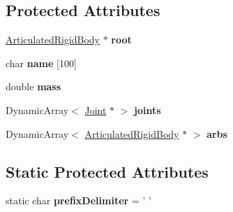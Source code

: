 \subsection*{Protected Attributes}
\begin{DoxyCompactItemize}
\item 
\hypertarget{classCartWheel_1_1Physics_1_1ArticulatedFigure_a728539753c6df22d8ba39049281540c1}{
\hyperlink{classCartWheel_1_1Physics_1_1ArticulatedRigidBody}{ArticulatedRigidBody} $\ast$ {\bfseries root}}
\label{classCartWheel_1_1Physics_1_1ArticulatedFigure_a728539753c6df22d8ba39049281540c1}

\item 
\hypertarget{classCartWheel_1_1Physics_1_1ArticulatedFigure_a7d160508fc74478814fa20c673e52e52}{
char {\bfseries name} \mbox{[}100\mbox{]}}
\label{classCartWheel_1_1Physics_1_1ArticulatedFigure_a7d160508fc74478814fa20c673e52e52}

\item 
\hypertarget{classCartWheel_1_1Physics_1_1ArticulatedFigure_a54a8c1542a1754aa72910b43f8f86f3b}{
double {\bfseries mass}}
\label{classCartWheel_1_1Physics_1_1ArticulatedFigure_a54a8c1542a1754aa72910b43f8f86f3b}

\item 
\hypertarget{classCartWheel_1_1Physics_1_1ArticulatedFigure_a5a850127e282748123c0c46f5ad695b0}{
DynamicArray$<$ \hyperlink{classCartWheel_1_1Physics_1_1Joint}{Joint} $\ast$ $>$ {\bfseries joints}}
\label{classCartWheel_1_1Physics_1_1ArticulatedFigure_a5a850127e282748123c0c46f5ad695b0}

\item 
\hypertarget{classCartWheel_1_1Physics_1_1ArticulatedFigure_a65d7df01ea5e87080260de611fb4eaf1}{
DynamicArray$<$ \hyperlink{classCartWheel_1_1Physics_1_1ArticulatedRigidBody}{ArticulatedRigidBody} $\ast$ $>$ {\bfseries arbs}}
\label{classCartWheel_1_1Physics_1_1ArticulatedFigure_a65d7df01ea5e87080260de611fb4eaf1}

\end{DoxyCompactItemize}
\subsection*{Static Protected Attributes}
\begin{DoxyCompactItemize}
\item 
\hypertarget{classCartWheel_1_1Physics_1_1ArticulatedFigure_a2bbfee02d4d55a892244fa855c305a7a}{
static char {\bfseries prefixDelimiter} = ' '}
\label{classCartWheel_1_1Physics_1_1ArticulatedFigure_a2bbfee02d4d55a892244fa855c305a7a}

\end{DoxyCompactItemize}
